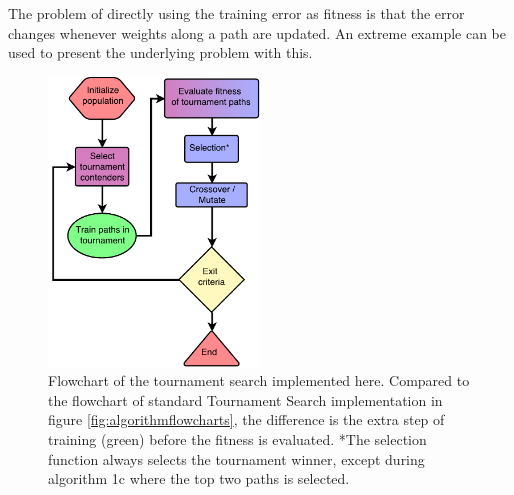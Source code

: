 The problem of directly using the training error as fitness is that the error changes whenever weights along a path are updated. An extreme example can be used to present the underlying problem with this.

\begin{figure}[ht]
    \centering
    \includegraphics[width=0.5\textwidth]{Chapters/4.Experiments/exp2/figures/TS_implementation.pdf}
    \caption[Tournament search flowchart]{Flowchart of the tournament search implemented here. Compared to the flowchart of standard Tournament Search implementation in figure \ref{fig:algorithmflowcharts}, the difference is the extra step of training (green) before the fitness is evaluated. *The selection function always selects the tournament winner, except during algorithm 1c where the top two paths is selected.}
    \label{fig:ts_flowchart}
\end{figure}

